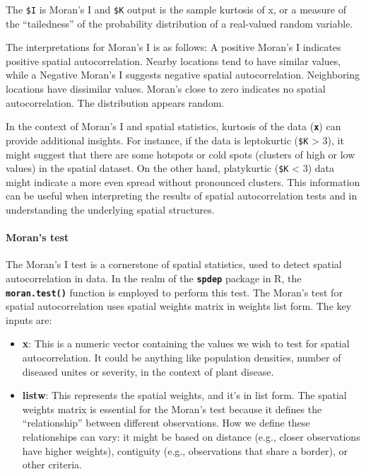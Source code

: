 \documentclass[
  letterpaper,
]{book}
\let\oldparagraph\paragraph
\renewcommand{\paragraph}[1]{\oldparagraph{#1}\mbox{}}
\begin{document}
The \texttt{\$I} is Moran's I and \texttt{\$K} output is the sample
kurtosis of x, or a measure of the ``tailedness'' of the probability
distribution of a real-valued random variable.

The interpretations for Moran's I is as follows: A positive Moran's I
indicates positive spatial autocorrelation. Nearby locations tend to
have similar values, while a Negative Moran's I suggests negative
spatial autocorrelation. Neighboring locations have dissimilar values.
Moran's close to zero indicates no spatial autocorrelation. The
distribution appears random.

In the context of Moran's I and spatial statistics, kurtosis of the data
(\textbf{\texttt{x}}) can provide additional insights. For instance, if
the data is leptokurtic (\texttt{\$K} \textgreater{} 3), it might
suggest that there are some hotspots or cold spots (clusters of high or
low values) in the spatial dataset. On the other hand, platykurtic
(\texttt{\$K} \textless{} 3) data might indicate a more even spread
without pronounced clusters. This information can be useful when
interpreting the results of spatial autocorrelation tests and in
understanding the underlying spatial structures.

\hypertarget{morans-test}{%
\paragraph{Moran's test}\label{morans-test}}

The Moran's I test is a cornerstone of spatial statistics, used to
detect spatial autocorrelation in data. In the realm of the
\textbf{\texttt{spdep}} package in R, the \textbf{\texttt{moran.test()}}
function is employed to perform this test. The Moran's test for spatial
autocorrelation uses spatial weights matrix in weights list form. The
key inputs are:

\begin{itemize}
\item
  \textbf{x}: This is a numeric vector containing the values we wish to
  test for spatial autocorrelation. It could be anything like population
  densities, number of diseased unites or severity, in the context of
  plant disease.
\item
  \textbf{listw}: This represents the spatial weights, and it's in list
  form. The spatial weights matrix is essential for the Moran's test
  because it defines the ``relationship'' between different
  observations. How we define these relationships can vary: it might be
  based on distance (e.g., closer observations have higher weights),
  contiguity (e.g., observations that share a border), or other
  criteria.
\end{itemize}
\end{document}
